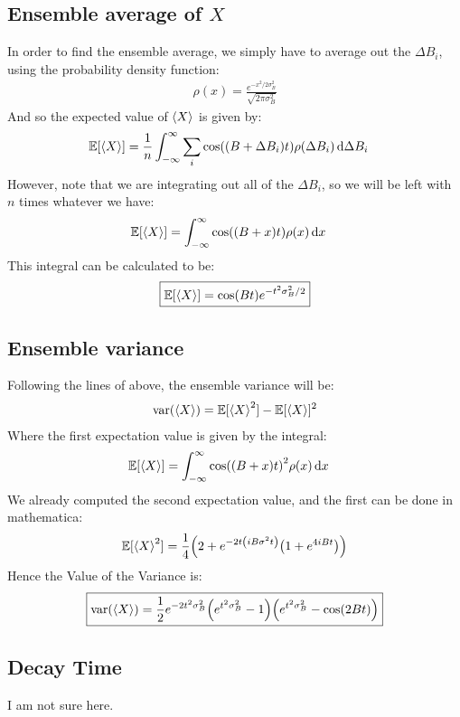 \documentclass[12pt]{article}
\begin{document}
\subsection{Ensemble average of $X$}
In order to find the ensemble average, we simply have to average out the $\Delta{B}_i$, using the probability density function:
\begin{align*}
  \rho(x)=\frac{e^{-x^2/2\sigma_B^2}}{\sqrt{2\pi\sigma_B^2}}
\end{align*}
And so the expected value of $\ev{X}$ is given by:
\begin{align*}
  \mathbb{E}[\ev{X}]&=
  \frac1n\int_{-\infty}^\infty\sum_i\cos((B+\Delta{B}_i)t)
  \rho(\Delta B_i)\dd{\Delta{B}_i}
\end{align*}
However, note that we are integrating out all of the $\Delta B_i$, so we will be left with $n$ times whatever we have:
\begin{align*}
  \mathbb{E}[\ev{X}]&=\int_{-\infty}^\infty\cos((B+x)t)\rho(x)\dd{x}
\end{align*}
This integral can be calculated to be:
\begin{align}
  \boxed{\mathbb{E}[\ev{X}]=\cos(Bt)e^{-t^2\sigma_B^2/2}}
\end{align}

\subsection{Ensemble variance}
Following the lines of above, the ensemble variance will be:
\begin{align*}
  \mathrm{var}(\ev{X})=\mathbb{E}[\ev{X}^2]-\mathbb{E}[\ev{X}]^2
\end{align*}
Where the first expectation value is given by the integral:
\begin{align*}
  \mathbb{E}[\ev{X}]&=\int_{-\infty}^\infty\cos((B+x)t)^2\rho(x)\dd{x}
\end{align*}
We already computed the second expectation value, and the first can be done in mathematica:
\begin{align*}
  \mathbb{E}[\ev{X}^2]=\frac14\qty(2+e^{-2t\qty(i B\sigma^2t)}\qty(1+e^{4iBt}))
\end{align*}
Hence the Value of the Variance is:
\begin{align*}
  \boxed{\mathrm{var}(\ev{X})=\frac12e^{-2t^2\sigma_B^2}
    \qty(e^{t^2\sigma_B^2}-1)\qty(e^{t^2\sigma_B^2}-\cos(2Bt))}
\end{align*}

\subsection{Decay Time}
I am not sure here.
\end{document}
